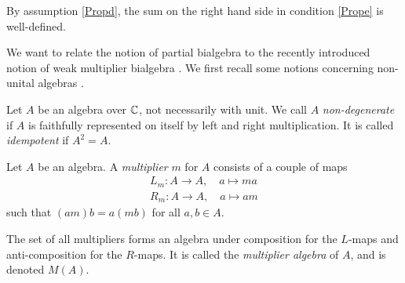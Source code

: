 
\begin{Rem} By assumption \ref{Propd}, the sum on the right hand side in condition \ref{Prope} is well-defined. 
\end{Rem}


We want to relate the notion of partial bialgebra to the recently introduced notion of weak multiplier bialgebra \cite{Boh1}. We first recall some notions concerning non-unital algebras \cite{Dau1,VDae1}.

\begin{Def} Let $A$ be an algebra over $\mathbb{C}$, not necessarily with unit. We call $A$ \emph{non-degenerate} if $A$ is faithfully represented on itself by left and right multiplication. It is called \emph{idempotent} if $A^2 = A$. 
\end{Def}

\begin{Def} Let $A$ be an algebra. A \emph{multiplier} $m$ for $A$ consists of a couple of maps \begin{eqnarray*} L_m:A\rightarrow A,\quad a\mapsto ma\\ R_m:A\rightarrow A,\quad a\mapsto am\end{eqnarray*} such that $(am)b = a(mb)$ for all $a,b\in A$. 

The set of all multipliers forms an algebra under composition for the $L$-maps and anti-composition for the $R$-maps. It is called the \emph{multiplier algebra} of $A$, and is denoted $M(A)$.
\end{Def}

